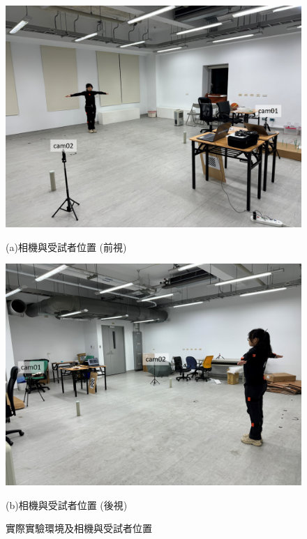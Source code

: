 \begin{figure}[!ht]
   \centering
   \begin{minipage}{.5\textwidth}
     \centering
     \includegraphics[width=.95\linewidth]{figure/ch3_fig_indoor_position1.png}
     \caption*{(a)相機與受試者位置 (前視)}
   \end{minipage}%
   \begin{minipage}{.5\textwidth}
      \centering
      \includegraphics[width=.95\linewidth]{figure/ch3_fig_indoor_position2.png}
      \caption*{(b)相機與受試者位置 (後視)}
   \end{minipage}%
   \caption[實際實驗環境及相機與受試者位置]{實際實驗環境及相機與受試者位置}
   \label{ch3_fig_indoor_position}
\end{figure}

